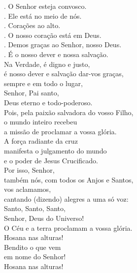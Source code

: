 \documentclass{book}
\begin{document}
\begin{flushleft}
    {\color{VioletRed2} \Vbar.} O Senhor esteja convosco. \\
    {\color{VioletRed2} \Rbar.} Ele está no meio de nós. \\
    {\color{VioletRed2} \Vbar.} Corações ao alto. \\
    {\color{VioletRed2} \Rbar.} O nosso coração está em Deus. \\
    {\color{VioletRed2} \Vbar.} Demos graças ao Senhor, nosso Deus. \\
    {\color{VioletRed2} \Rbar.} É o nosso dever e nossa salvação.
    \vspace{.2cm} \\
    Na Verdade, é digno e justo, \\
    é nosso dever e salvação dar-vos graças, \\
    sempre e em todo o lugar, \\
    Senhor, Pai santo, \\
    Deus eterno e todo-poderoso.
    \vspace{.2cm} \\
    Pois, pela paixão salvadora do vosso Filho, \\
    o mundo inteiro recebeu \\
    a missão de proclamar a vossa glória. \\
    A força radiante da cruz \\
    manifesta o julgamento do mundo \\
    e o poder de Jesus Crucificado.
    \vspace{.2cm} \\
    Por isso, Senhor, \\
    também nós, com todos os Anjos e Santos, \\
    vos aclamamos, \\
    cantando {\color{VioletRed2}(}dizendo{\color{VioletRed2})} alegres a uma só voz:
    \vspace{.2cm} \\
    Santo, Santo, Santo, \\
    Senhor, Deus do Universo! \\
    O Céu e a terra proclamam a vossa glória. \\
    Hosana nas alturas! \\
    Bendito o que vem \\
    em nome do Senhor! \\
    Hosana nas alturas!
    \vspace{.2cm} \\

\end{flushleft}
\end{document}
